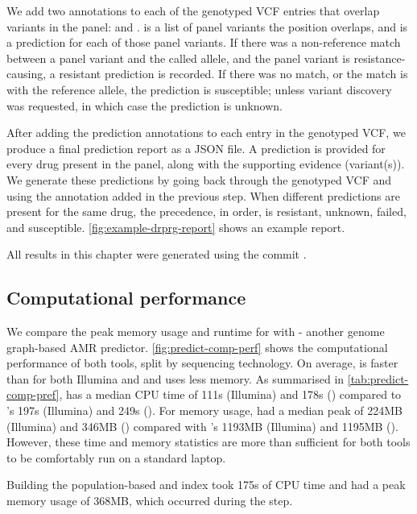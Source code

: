 We add two annotations to each of the genotyped VCF entries that overlap variants in the panel:  and .  is a list of panel variants the position overlaps, and  is a prediction for each of those panel variants. If there was a non-reference match between a panel variant and the called allele, and the panel variant is resistance-causing, a resistant prediction is recorded. If there was no match, or the match is with the reference allele, the prediction is susceptible; unless variant discovery was requested, in which case the prediction is unknown. 

After adding the prediction annotations to each entry in the genotyped VCF, we produce a final prediction report as a JSON file. A prediction is provided for every drug present in the panel, along with the supporting evidence (variant(s)). We generate these predictions by going back through the genotyped VCF and using the  annotation added in the previous step. When different predictions are present for the same drug, the precedence, in order, is resistant, unknown, failed, and susceptible. \autoref{fig:example-drprg-report} shows an example report.

\noindent
All \drprg{} results in this chapter were generated using the commit \href{https://github.com/mbhall88/drprg/tree/cb4f9b82b5d03de45b8016ae5d54bbce7a8f3a0f}{}.

\subsection{Computational performance}
\label{sec:drprg-comp-perf}

We compare the peak memory usage and runtime for \drprg{}  with \mykrobe{} - another genome graph-based AMR predictor. \autoref{fig:predict-comp-perf} shows the computational performance of both tools, split by sequencing technology. On average, \drprg{} is faster than \mykrobe{} for both Illumina and \ont{} and uses less memory. As summarised in \autoref{tab:predict-comp-pref}, \drprg{} has a median CPU time of 111s (Illumina) and 178s (\ont{}) compared to \mykrobe{}'s 197s (Illumina) and 249s (\ont{}). For memory usage, \drprg{} had a median peak of 224MB (Illumina) and 346MB (\ont{}) compared with \mykrobe{}'s 1193MB (Illumina) and 1195MB (\ont{}). However, these time and memory statistics are more than sufficient for both tools to be comfortably run on a standard laptop. 

Building the \drprg{} population-based \panrg{} and index took 175s of CPU time and had a peak memory usage of 368MB, which occurred during the \makeprg{} step.

